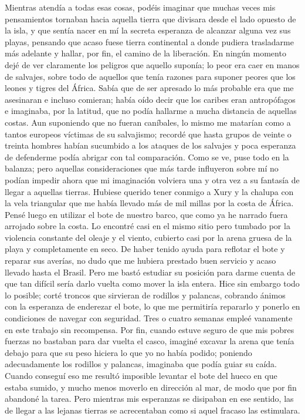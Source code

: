 \documentclass{novela}
\begin{document}
    Mientras atendía a todas esas cosas, podéis imaginar que muchas veces mis pensamientos tornaban hacia aquella tierra que divisara desde el lado opuesto de la isla, y que sentía nacer en mí la secreta esperanza de alcanzar alguna vez sus playas, pensando que acaso fuese tierra continental a donde pudiera trasladarme más adelante y hallar, por fin, el camino de la liberación.
    En ningún momento dejé de ver claramente los peligros que aquello suponía; lo peor era caer en manos de salvajes, sobre todo de aquellos que tenía razones para suponer peores que los leones y tigres del África. Sabía que de ser apresado lo más probable era que me asesinaran e incluso comieran; había oído decir que los caribes eran antropófagos e imaginaba, por la latitud, que no podía hallarme a mucha distancia de aquellas costas. Aun suponiendo que no fueran caníbales, lo mismo me matarían como a tantos europeos víctimas de su salvajismo; recordé que hasta grupos de veinte o treinta hombres habían sucumbido a los ataques de los salvajes y poca esperanza de defenderme podía abrigar con tal comparación. Como se ve, puse todo en la balanza; pero aquellas consideraciones que más tarde influyeron sobre mí no podían impedir ahora que mi imaginación volviera una y otra vez a su fantasía de llegar a aquellas tierras.
    Hubiese querido tener conmigo a Xury y la chalupa con la vela triangular que me había llevado más de mil millas por la costa de África. Pensé luego en utilizar el bote de nuestro barco, que como ya he narrado fuera arrojado sobre la costa. Lo encontré casi en el mismo sitio pero tumbado por la violencia constante del oleaje y el viento, cubierto casi por la arena gruesa de la playa y completamente en seco.
    De haber tenido ayuda para reflotar el bote y reparar sus averías, no dudo que me hubiera prestado buen servicio y acaso llevado hasta el Brasil. Pero me bastó estudiar su posición para darme cuenta de que tan difícil sería darlo vuelta como mover la isla entera. Hice sin embargo todo lo posible; corté troncos que sirvieran de rodillos y palancas, cobrando ánimos con la esperanza de enderezar el bote, lo que me permitiría repararlo y ponerlo en condiciones de navegar con seguridad.
    Tres o cuatro semanas empleé vanamente en este trabajo sin recompensa. Por fin, cuando estuve seguro de que mis pobres fuerzas no bastaban para dar vuelta el casco, imaginé excavar la arena que tenía debajo para que su peso hiciera lo que yo no había podido; poniendo adecuadamente los rodillos y palancas, imaginaba que podía guiar su caída. Cuando conseguí eso me resultó imposible levantar el bote del hueco en que estaba sumido, y mucho menos moverlo en dirección al mar, de modo que por fin abandoné la tarea. Pero mientras mis esperanzas se disipaban en ese sentido, las de llegar a las lejanas tierras se acrecentaban como si aquel fracaso las estimulara.
\end{document}
